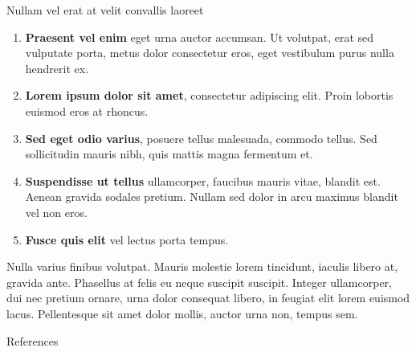 \begin{frame}[t]
\begin{columns}[t]
\begin{column}{\colwidth}
\begin{block}{Nullam vel erat at velit convallis laoreet}
    \begin{enumerate}
      \item \textbf{Praesent vel enim} eget urna auctor accumsan. Ut volutpat, erat sed vulputate porta, metus dolor consectetur eros, eget vestibulum purus nulla hendrerit ex.
      \item \textbf{Lorem ipsum dolor sit amet}, consectetur adipiscing elit. Proin lobortis euismod eros at rhoncus.
      \item \textbf{Sed eget odio varius}, posuere tellus malesuada, commodo tellus. Sed sollicitudin mauris nibh, quis mattis magna fermentum et.
      \item \textbf{Suspendisse ut tellus} ullamcorper, faucibus mauris vitae, blandit est. Aenean gravida sodales pretium. Nullam sed dolor in arcu maximus blandit vel non eros.
      \item \textbf{Fusce quis elit} vel lectus porta tempus.
    \end{enumerate}

    Nulla varius finibus volutpat. Mauris molestie lorem tincidunt, iaculis
    libero at, gravida ante. Phasellus at felis eu neque suscipit suscipit.
    Integer ullamcorper, dui nec pretium ornare, urna dolor consequat libero,
    in feugiat elit lorem euismod lacus. Pellentesque sit amet dolor mollis,
    auctor urna non, tempus sem.

  \end{block}

  \begin{block}{References}

    \nocite{*}
    \footnotesize{}

  \end{block}

\end{column}

\separatorcolumn
\end{columns}
\end{frame}


